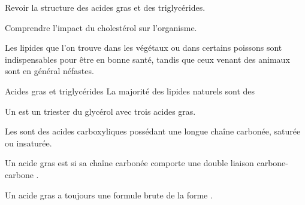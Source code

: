 \teteTermStssBiom
\vspace*{-38pt}

\begin{objectifs}
  \item Revoir la structure des acides gras et des triglycérides.
  \item Comprendre l'impact du cholestérol sur l'organisme.
\end{objectifs}

\begin{contexte}
  Les lipides que l'on trouve dans les végétaux ou dans certains poissons sont indispensables pour être en bonne santé, tandis que ceux venant des animaux sont en général néfastes.
  
\end{contexte}


\begin{doc}{Acides gras et triglycérides}
  La majorité des lipides naturels sont des 
  \begin{importants}
    Un  est un triester du glycérol avec trois acides gras.
    
    Les  sont des acides carboxyliques possédant une longue chaîne carbonée, saturée ou insaturée.
    
    Un acide gras est  si sa chaîne carbonée comporte une double liaison carbone-carbone .
  \end{importants}
  Un acide gras  a toujours une formule brute de la forme .
\end{doc}

